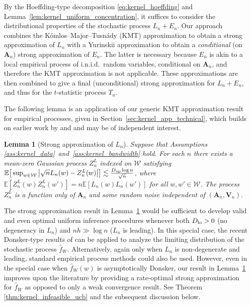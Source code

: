 \documentclass[11pt,lof]{puthesis}
\newcommand{\E}{\ensuremath{\mathbb{E}}}
\newcommand{\bA}{\ensuremath{\mathbf{A}}}
\newcommand{\bV}{\ensuremath{\mathbf{V}}}
\newcommand{\cW}{\ensuremath{\mathcal{W}}}
\newcommand{\Dl}{\ensuremath{D_{\textup{lo}}}}
\newcommand{\Du}{\ensuremath{D_{\textup{up}}}}
\theoremstyle{break}
\newtheorem{lemma}{Lemma}[section]
\theoremstyle{proof}
\begin{document}
By the Hoeffding-type decomposition \eqref{eq:kernel_hoeffding} and
Lemma~\ref{lem:kernel_uniform_concentration}, it suffices to consider the
distributional properties of the stochastic process $L_n + E_n$.
Our approach combines the K{\'o}mlos--Major--Tusn{\'a}dy (KMT) approximation
\citep{komlos1975approximation} to obtain a strong approximation of $L_n$ with
a Yurinskii approximation \citep{yurinskii1978error} to obtain a
\emph{conditional} (on $\bA_n$) strong approximation of $E_n$. The latter is
necessary because $E_n$ is akin to a local empirical process of i.n.i.d.\
random variables, conditional on $\bA_n$, and therefore the KMT approximation
is not applicable. These approximations are then combined to give a final
(unconditional) strong approximation for $L_n+E_n$, and thus for the
$t$-statistic process $T_n$.

The following lemma is an application of our generic KMT approximation result
for empirical processes, given in Section~\ref{sec:kernel_app_technical}, which
builds on earlier work by \citet{gine2004kernel} and \citet{gine2010confidence}
and may be of independent interest.

\begin{lemma}[Strong approximation of $L_n$]
  \label{lem:kernel_strong_approx_Ln}
  Suppose that Assumptions \ref{ass:kernel_data}~and~\ref{ass:kernel_bandwidth}
  hold. For each $n$ there exists a mean-zero Gaussian process $Z^L_n$ indexed
  on $\cW$ satisfying
  $\E\big[ \sup_{w \in \cW} \big| \sqrt{n} L_n(w) - Z_n^L(w) \big| \big]
  \lesssim \frac{\Du \log n}{\sqrt{n}}$, where
  $\E[Z_n^L(w)Z_n^L(w')] = n\E[L_n(w)L_n(w')]$ for all $w, w' \in \cW$. The
  process $Z_n^L$ is a function only of $\bA_n$ and some random noise
  independent of $(\bA_n, \bV_n)$.
\end{lemma}

The strong approximation result in Lemma~\ref{lem:kernel_strong_approx_Ln}
would be
sufficient to develop valid and even optimal uniform inference procedures
whenever both $\Dl > 0$ (no degeneracy in $L_n$) and $n h \gg \log n$
($L_n$ is leading). In this special case, the recent Donsker-type results of
\citet{davezies2021exchangeable} can be applied to analyze the limiting
distribution of the stochastic process $\hat{f}_W$. Alternatively, again only
when $L_n$ is non-degenerate and leading, standard empirical process methods
could also be used. However, even in the special case when $\hat{f}_W(w)$ is
asymptotically Donsker, our result in Lemma~\ref{lem:kernel_strong_approx_Ln}
improves upon the literature by providing a rate-optimal strong approximation
for $\hat{f}_W$ as opposed to only a weak convergence result. See Theorem
\ref{thm:kernel_infeasible_ucb} and the subsequent discussion below.
\end{document}
